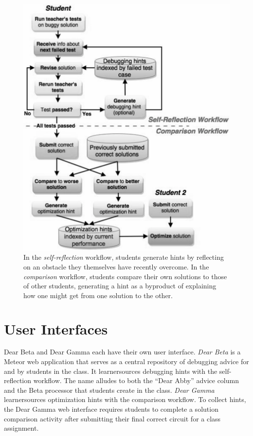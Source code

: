 \begin{figure}
\centering
\includegraphics[width=0.75\columnwidth]{Body/figures/classoverflow/CombinedWorkflow_grey.pdf}
\caption{In the \textit{self-reflection} workflow, students generate hints by reflecting on an obstacle they themselves have recently overcome. In the \textit{comparison} workflow, students compare their own solutions to those of other students, generating a hint as a byproduct of explaining how one might get from one solution to the other.}
\label{fig:workflow}
\end{figure}

\section{User Interfaces} 
Dear Beta and Dear Gamma each have their own user interface.
{\it Dear Beta} is a Meteor web application that serves as a central repository of debugging advice for and by students in the class. It learnersources debugging hints with the self-reflection workflow. The name alludes to both the ``Dear Abby'' advice column and the Beta processor that students create in the class. {\it Dear Gamma} learnersources optimization hints with the comparison workflow. To collect hints, the Dear Gamma web interface requires students to complete a solution comparison activity after submitting their final correct circuit for a class assignment.

